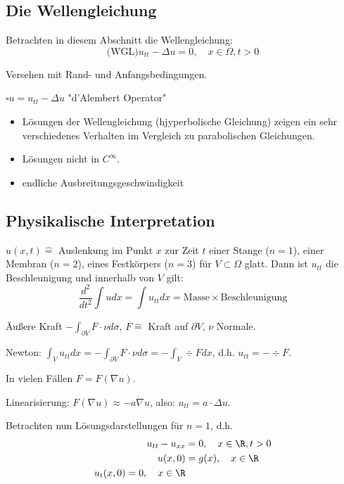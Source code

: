 \subsection{Die Wellengleichung}

Betrachten in diesem Abschnitt die Wellengleichung:
$$
\text{(WGL)} u_{tt} - \Delta u = 0, \quad x \in \Omega, t > 0
$$

Versehen mit Rand- und Anfangsbedingungen.

\begin{ntion}
  $\square u = u_{tt} - \Delta u$ "d'Alembert Operator"
\end{ntion}

\begin{itemize}
  \item Lösungen der Wellengleichung (hjyperbolische Gleichung) zeigen ein sehr verschiedenes Verhalten im Vergleich zu parabolischen Gleichungen.
  \item Lösungen nicht in $C^\infty$.
  \item endliche Ausbreitungsgeschwindigkeit
\end{itemize}

\subsection{Physikalische Interpretation}

$u(x,t)  \hat = $ Auslenkung im Punkt $x$ zur Zeit $t$ einer Stange ($n = 1$), einer Membran ($n = 2$), eines Festkörpers ($n = 3$) für $V \subset \Omega$ glatt.
Dann ist $u_{tt}$ die Beschleunigung und innerhalb von $V$ gilt: 
$$
\frac{d^2}{dt^2} \int u dx = \int u_{tt} dx = \text{Masse} \times \text{Beschleunigung}
$$

Äußere Kraft $-\int_{\partial V} F \cdot \nu d \sigma$, $F \hat =$ Kraft auf $\partial V$, $\nu$ Normale.

Newton: $\int_V u_{tt} dx = -\int_{\partial V} F \cdot \nu d\sigma = - \int_V \div F dx$, d.h. $u_{tt} = -\div F$.

In vielen Fällen $F = F(\nabla u)$.

Linearisierung: $F(\nabla u) \approx -a \dot \nabla u$, also: $u_{tt} = a \cdot \Delta u$.

Betrachten nun Lösungsdarstellungen für $n = 1$, d.h.
\begin{align*}
  u_{tt} - u_{xx} &= 0, \quad x \in \R, t > 0 \\
  u(x,0) &= g(x), \quad x \in \R \\
  u_t(x,0) = 0, \quad x \in \R
\end{align*}

